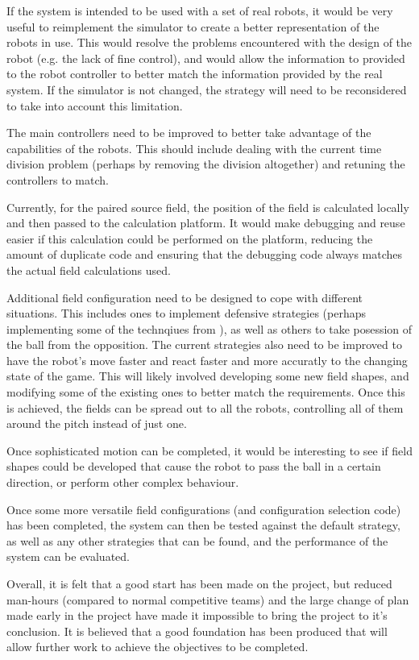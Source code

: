 \documentclass[10pt]{article}
\begin{document}
If the system is intended to be used with a set of real robots, it would be very
useful to reimplement the simulator to create a better representation of the
robots in use.  This would resolve the problems encountered with the design of
the robot (e.g. the lack of fine control), and would allow the information to
provided to the robot controller to better match the information provided by the
real system.  If the simulator is not changed, the strategy will need to be
reconsidered to take into account this limitation.

The main controllers need to be improved to better take advantage of the
capabilities of the robots.  This should include dealing with the current time
division problem (perhaps by removing the division altogether) and retuning the
controllers to match.

Currently, for the paired source field, the position of the field is calculated
locally and then passed to the calculation platform.  It would make debugging
and reuse easier if this calculation could be performed on the platform,
reducing the amount of duplicate code and ensuring that the debugging code
always matches the actual field calculations used.

Additional field configuration need to be designed to cope with different
situations.  This includes ones to implement defensive strategies (perhaps
implementing some of the technqiues from \cite{neuroHassleDefence}), as well as
others to take posession of the ball from the opposition. The current strategies
also need to be improved to have the robot's move faster and react faster and
more accuratly to the changing state of the game.  This will likely involved
developing some new field shapes, and modifying some of the existing ones to
better match the requirements. Once this is achieved, the fields can be spread
out to all the robots, controlling all of them around the pitch instead of just
one.

Once sophisticated motion can be completed, it would be interesting to see if
field shapes could be developed that cause the robot to pass the ball in a
certain direction, or perform other complex behaviour.

Once some more versatile field configurations (and configuration selection code)
has been completed, the system can then be tested against the default strategy,
as well as any other strategies that can be found, and the performance of the
system can be evaluated.

Overall, it is felt that a good start has been made on the project, but reduced
man-hours (compared to normal competitive teams) and the large change of plan
made early in the project have made it impossible to bring the project to it's
conclusion.  It is believed that a good foundation has been produced that will
allow further work to achieve the objectives to be completed.

\cleardoublepage{}

\end{document}
